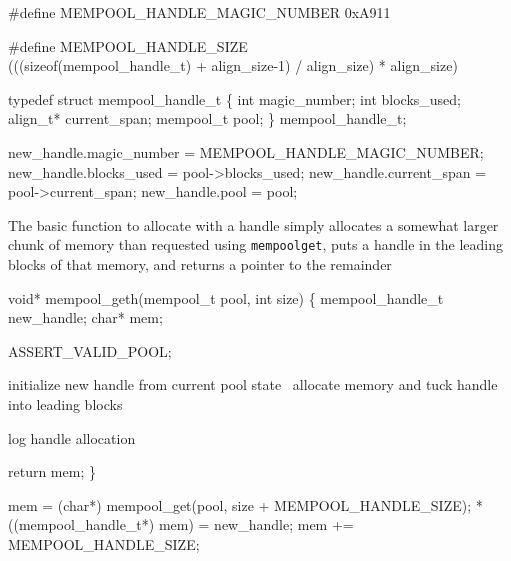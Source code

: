 \nwenddocs{}\plusendmoddef
#define MEMPOOL_HANDLE_MAGIC_NUMBER 0xA911

#define MEMPOOL_HANDLE_SIZE \\
   (((sizeof(mempool_handle_t) + align_size-1) / align_size) * align_size)

typedef struct mempool_handle_t \{
    int magic_number;
    int blocks_used;
    align_t* current_span;
    mempool_t pool;
\} mempool_handle_t;

\nwendcode{}\nwdocspar

\nwenddocs{}\endmoddef
new_handle.magic_number = MEMPOOL_HANDLE_MAGIC_NUMBER;
new_handle.blocks_used  = pool->blocks_used;
new_handle.current_span = pool->current_span;
new_handle.pool         = pool;
\nwendcode{}\nwdocspar

The basic function to allocate with a handle simply allocates
a somewhat larger chunk of memory than requested using
{\tt{}mempool{}get}, puts a handle in the leading blocks of
that memory, and returns a pointer to the remainder

\nwenddocs{}\plusendmoddef
void* mempool_geth(mempool_t pool, int size)
\{
    mempool_handle_t new_handle;
    char* mem;

    ASSERT_VALID_POOL;

    \LA{}initialize new handle from current pool state~{\nwtagstyle{}}\RA{}
    \LA{}allocate memory and tuck handle into leading blocks~{\nwtagstyle{}}\RA{}

    \LA{}log handle allocation~{\nwtagstyle{}}\RA{}

    return mem;
\}

\nwendcode{}\nwdocspar

\nwenddocs{}\endmoddef
mem = (char*) mempool_get(pool, size + MEMPOOL_HANDLE_SIZE);
*((mempool_handle_t*) mem) = new_handle;
mem += MEMPOOL_HANDLE_SIZE;
\nwendcode{}\nwdocspar

